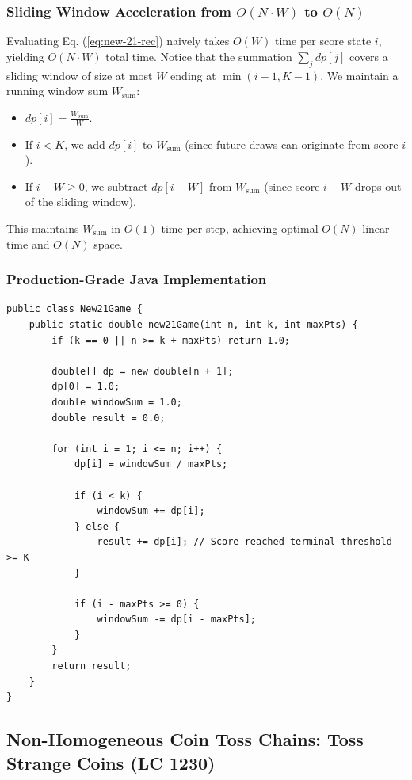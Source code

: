 \documentclass[10pt,journal,compsoc,onecolumn]{IEEEtran}
\begin{document}
\subsubsection{Sliding Window Acceleration from $O(N \cdot W)$ to $O(N)$}
Evaluating Eq. (\ref{eq:new-21-rec}) naively takes $O(W)$ time per score state $i$, yielding $O(N \cdot W)$ total time. Notice that the summation $\sum_{j} dp[j]$ covers a sliding window of size at most $W$ ending at $\min(i-1, K-1)$.
We maintain a running window sum $W_{\text{sum}}$:
\begin{itemize}
    \item $dp[i] = \frac{W_{\text{sum}}}{W}$.
    \item If $i < K$, we add $dp[i]$ to $W_{\text{sum}}$ (since future draws can originate from score $i$).
    \item If $i - W \ge 0$, we subtract $dp[i - W]$ from $W_{\text{sum}}$ (since score $i-W$ drops out of the sliding window).
\end{itemize}
This maintains $W_{\text{sum}}$ in $O(1)$ time per step, achieving optimal $O(N)$ linear time and $O(N)$ space.

\subsubsection{Production-Grade Java Implementation}

\begin{verbatim}
public class New21Game {
    public static double new21Game(int n, int k, int maxPts) {
        if (k == 0 || n >= k + maxPts) return 1.0;

        double[] dp = new double[n + 1];
        dp[0] = 1.0;
        double windowSum = 1.0;
        double result = 0.0;

        for (int i = 1; i <= n; i++) {
            dp[i] = windowSum / maxPts;

            if (i < k) {
                windowSum += dp[i];
            } else {
                result += dp[i]; // Score reached terminal threshold >= K
            }

            if (i - maxPts >= 0) {
                windowSum -= dp[i - maxPts];
            }
        }
        return result;
    }
}
\end{verbatim}

\subsection{Non-Homogeneous Coin Toss Chains: Toss Strange Coins (LC 1230)}
\end{document}
